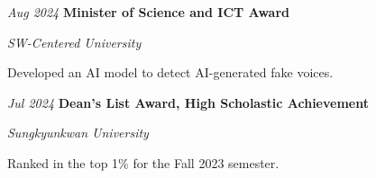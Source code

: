 \vspace{0.08cm}

\begin{samepage}
    \begin{twocolentry}{\textit{Aug 2024}}
        \textbf{Minister of Science and ICT Award}\href{https://github.com/rkdrn79/2024_SW_Centered_University_Digital_Competition_SKKUAI}{}
        \par\textit{SW-Centered University}
    \end{twocolentry}
    \begin{onecolentry}
        \begin{highlights}
            \item Developed an AI model to detect AI-generated fake voices.
        \end{highlights}
    \end{onecolentry}
\end{samepage}

\vspace{0.08cm}

\begin{samepage}
    \begin{twocolentry}{\textit{Jul 2024}}
        \textbf{Dean's List Award, High Scholastic Achievement}
        \par\textit{Sungkyunkwan University}
    \end{twocolentry}
    \begin{onecolentry}
        \begin{highlights}
            \item Ranked in the top 1\% for the Fall 2023 semester.
        \end{highlights}
    \end{onecolentry}
\end{samepage}

\endgroup
